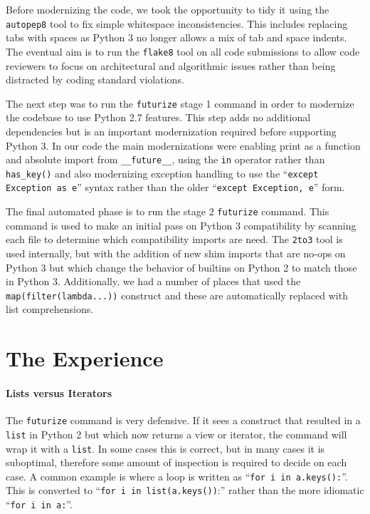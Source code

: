 \documentclass[11pt,twoside]{article}
\begin{document}
Before modernizing the code, we took the opportunity to tidy it using the \texttt{autopep8} tool to fix simple whitespace inconsistencies.
This includes replacing tabs with spaces as Python 3 no longer allows a mix of tab and space indents.
The eventual aim is to run the \texttt{flake8} tool on all code submissions to allow code reviewers to focus on architectural and algorithmic issues rather than being distracted by coding standard violations.

The next step was to run the \texttt{futurize} stage 1 command in order to modernize the codebase to use Python 2.7 features.
This step adds no additional dependencies but is an important modernization required before supporting Python 3.
In our code the main modernizations were enabling print as a function and absolute import from \texttt{\_\_future\_\_}, using the \texttt{in} operator rather than \texttt{has\_key()} and also modernizing exception handling to use the ``\texttt{except Exception as e}'' syntax rather than the older ``\texttt{except Exception, e}'' form.

The final automated phase is to run the stage 2 \texttt{futurize} command.
This command is used to make an initial pass on Python 3 compatibility by scanning each file to determine which compatibility imports are need.
The \texttt{2to3} tool is used internally, but with the addition of new shim imports that are no-ops on Python 3 but which change the behavior of builtins on Python 2 to match those in Python 3.
Additionally, we had a number of places that used the \texttt{map(filter(lambda...))} construct and these are automatically replaced with list comprehensions.

\section{The Experience}

\paragraph{Lists versus Iterators}

The \texttt{futurize} command is very defensive.
If it sees a construct that resulted in a \texttt{list} in Python 2 but which now returns a view or iterator, the command will wrap it with a \texttt{list}.
In some cases this is correct, but in many cases it is suboptimal, therefore some amount of inspection is required to decide on each case.
A common example is where a loop is written as ``\texttt{for i in a.keys():}''.
This is converted to ``\texttt{for i in list(a.keys())}:'' rather than the more idiomatic ``\texttt{for i in a:}''.
\end{document}

